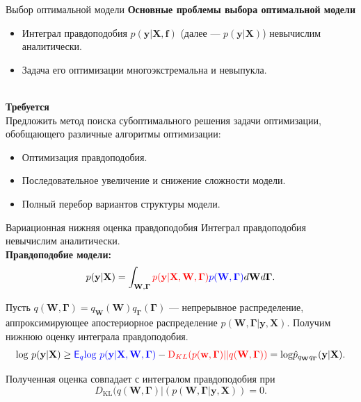 \documentclass[usenames,dvipsnames,11pt,pdf,utf8,russian,aspectratio=169]{beamer}
\begin{document}
\begin{frame}{Выбор оптимальной модели}
\textbf{Основные проблемы выбора оптимальной модели}\\
\begin{itemize}
\item Интеграл правдоподобия $p(\mathbf{y}|\mathbf{X}, \mathbf{f})$ (далее --- $p(\mathbf{y}|\mathbf{X})$)  невычислим аналитически.
\item Задача его оптимизации многоэкстремальна и невыпукла.
\end{itemize}
~\\
\textbf{Требуется}\\ 
Предложить метод поиска субоптимального решения задачи оптимизации, обобщающего различные алгоритмы оптимизации:
\begin{itemize}
\item Оптимизация правдоподобия.
\item Последовательное увеличение и снижение сложности модели.
\item Полный перебор вариантов структуры модели.
\end{itemize}

\end{frame}       


                                                                                                                                   
                                                                                                                                    

\begin{frame}{Вариационная нижняя оценка правдоподобия} 
Интеграл правдоподобия невычислим аналитически.\\
\textbf{Правдоподобие модели:}
\[
p(\mathbf{y}|\mathbf{X}) =
 \int_{\mathbf{W}, \boldsymbol{\Gamma} } \textcolor{red}{p(\mathbf{y}|\mathbf{X},\mathbf{W},  \boldsymbol{\Gamma})} \textcolor{blue}{p(\mathbf{W}, \boldsymbol{\Gamma})}d\mathbf{W}d{\boldsymbol{\Gamma}}.                         
\]

Пусть $q(\mathbf{W}, \boldsymbol{\Gamma}) = q_{\mathbf{W}}(\mathbf{W})q_{\boldsymbol{\Gamma}}(\boldsymbol{\Gamma})$ --- непрерывное распределение, аппроксимирующее 
апостериорное распределение $p(\mathbf{W}, \boldsymbol{\Gamma}|\mathbf{y}, \mathbf{X})$.
Получим нижнюю оценку интеграла правдоподобия.\\
$$                                                                                                                                              
        \text{log}~p(\mathbf{y}|\mathbf{X}) \geq 
\textcolor{blue}{\mathsf{E}_q \text{log}~{p(\mathbf{y} | \mathbf{X}, \mathbf{W}, \boldsymbol{\Gamma})}} - \textcolor{red}{\text{D}_{KL}(p(\mathbf{w}, \boldsymbol{\Gamma}) || q(\mathbf{W}, \boldsymbol{\Gamma}))} = \text{log}\hat{{p}}_{q_{\mathbf{W}}q_{\boldsymbol{\Gamma}}}(\mathbf{y}|\mathbf{X}).
$$ 

Полученная оценка совпадает с интегралом правдоподобия при $$D_\text{KL}(q(\mathbf{W}, \boldsymbol{\Gamma})|(p(\mathbf{W}, \boldsymbol{\Gamma}|\mathbf{y}, \mathbf{X}))=0.$$

\end{frame}      
\end{document}
